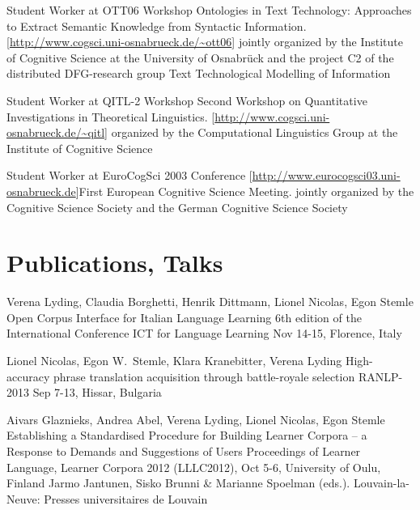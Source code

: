 \documentclass[11pt,a4paper]{moderncv}
\begin{document}
        {Student Worker at OTT06}
        {Workshop}
        {Ontologies in Text Technology: Approaches to Extract Semantic
        Knowledge from Syntactic Information.}
        {[\url{http://www.cogsci.uni-osnabrueck.de/~ott06}]}
        {jointly organized by the Institute of Cognitive Science at the
        University of Osnabr\"{u}ck and the project C2 of the distributed
        DFG-research group Text Technological Modelling of Information}

        {Student Worker at QITL-2}
        {Workshop}
        {Second Workshop on Quantitative Investigations in Theoretical
        Linguistics.}
        {[\url{http://www.cogsci.uni-osnabrueck.de/~qitl}]}
        {organized by the Computational Linguistics Group at the Institute of
        Cognitive Science}

        {Student Worker at EuroCogSci 2003}
        {Conference}
        {[\url{http://www.eurocogsci03.uni-osnabrueck.de}]}{First European
        Cognitive Science Meeting.}
        {jointly organized by the Cognitive Science Society and the German
        Cognitive Science Society}
\closesection{}


%
%

\section{Publications, Talks}
    
        {Verena Lyding, Claudia Borghetti, Henrik Dittmann, Lionel Nicolas, Egon Stemle}
        {\small Open Corpus Interface for Italian Language Learning}
        {\small 6th edition of the International Conference ICT for Language Learning} 
        {\small Nov 14-15, Florence, Italy}
        {}

        {Lionel Nicolas, Egon W.~Stemle, Klara Kranebitter, Verena Lyding}
        {\small High-accuracy phrase translation acquisition through
        battle-royale selection}
        {\small RANLP-2013}
        {\small Sep 7-13, Hissar, Bulgaria}
        {}

        {Aivars Glaznieks, Andrea Abel, Verena Lyding, Lionel Nicolas, Egon
        Stemle}
        {\small Establishing a Standardised Procedure for Building Learner
        Corpora – a Response to Demands and Suggestions of Users}
        {\small Proceedings of Learner Language, Learner Corpora 2012
        (LLLC2012), Oct 5-6, University of Oulu, Finland}
        {\small Jarmo Jantunen, Sisko Brunni \&
        Marianne Spoelman (eds.). Louvain-la-Neuve: Presses universitaires de
        Louvain}
        {}
\end{document}
